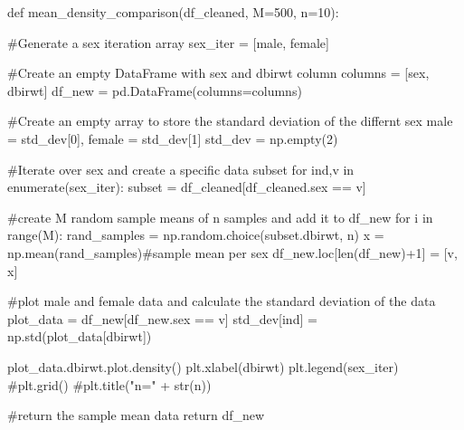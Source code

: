 \documentclass[
  letterpaper,
  DIV=11,
  numbers=noendperiod]{scrreprt}
\newenvironment{Shaded}{\begin{snugshade}}{\end{snugshade}}
\newcommand{\BuiltInTok}[1]{\textcolor[rgb]{0.00,0.23,0.31}{#1}}
\newcommand{\CommentTok}[1]{\textcolor[rgb]{0.37,0.37,0.37}{#1}}
\newcommand{\ControlFlowTok}[1]{\textcolor[rgb]{0.00,0.23,0.31}{#1}}
\newcommand{\DecValTok}[1]{\textcolor[rgb]{0.68,0.00,0.00}{#1}}
\newcommand{\KeywordTok}[1]{\textcolor[rgb]{0.00,0.23,0.31}{#1}}
\newcommand{\NormalTok}[1]{\textcolor[rgb]{0.00,0.23,0.31}{#1}}
\newcommand{\OperatorTok}[1]{\textcolor[rgb]{0.37,0.37,0.37}{#1}}
\newcommand{\StringTok}[1]{\textcolor[rgb]{0.13,0.47,0.30}{#1}}
\begin{document}
\begin{Shaded}
\begin{Highlighting}[]
\KeywordTok{def}\NormalTok{ mean\_density\_comparison(df\_cleaned, M}\OperatorTok{=}\DecValTok{500}\NormalTok{, n}\OperatorTok{=}\DecValTok{10}\NormalTok{):}
    
    \CommentTok{\#Generate a sex iteration array}
\NormalTok{    sex\_iter }\OperatorTok{=}\NormalTok{ [}\StringTok{\textquotesingle{}male\textquotesingle{}}\NormalTok{, }\StringTok{\textquotesingle{}female\textquotesingle{}}\NormalTok{]}
    
    \CommentTok{\#Create an empty DataFrame with \textquotesingle{}sex\textquotesingle{} and \textquotesingle{}dbirwt\textquotesingle{} column}
\NormalTok{    columns }\OperatorTok{=}\NormalTok{ [}\StringTok{\textquotesingle{}sex\textquotesingle{}}\NormalTok{, }\StringTok{\textquotesingle{}dbirwt\textquotesingle{}}\NormalTok{]}
\NormalTok{    df\_new }\OperatorTok{=}\NormalTok{ pd.DataFrame(columns}\OperatorTok{=}\NormalTok{columns)}
    
    \CommentTok{\#Create an empty array to store the standard deviation of the differnt sex \textquotesingle{}male\textquotesingle{} = std\_dev[0], \textquotesingle{}female\textquotesingle{} = std\_dev[1]}
\NormalTok{    std\_dev }\OperatorTok{=}\NormalTok{ np.empty(}\DecValTok{2}\NormalTok{)}
    
    \CommentTok{\#Iterate over sex and create a specific data subset}
    \ControlFlowTok{for}\NormalTok{ ind,v }\KeywordTok{in} \BuiltInTok{enumerate}\NormalTok{(sex\_iter):}
\NormalTok{        subset }\OperatorTok{=}\NormalTok{ df\_cleaned[df\_cleaned.sex }\OperatorTok{==}\NormalTok{ v]}
        
        \CommentTok{\#create M random sample means of n samples and add it to df\_new}
        \ControlFlowTok{for}\NormalTok{ i }\KeywordTok{in} \BuiltInTok{range}\NormalTok{(M):}
\NormalTok{            rand\_samples }\OperatorTok{=}\NormalTok{ np.random.choice(subset.dbirwt, n)}
\NormalTok{            x }\OperatorTok{=}\NormalTok{ np.mean(rand\_samples)}\CommentTok{\#sample mean per sex}
\NormalTok{            df\_new.loc[}\BuiltInTok{len}\NormalTok{(df\_new)}\OperatorTok{+}\DecValTok{1}\NormalTok{] }\OperatorTok{=}\NormalTok{ [v, x]}
        
        \CommentTok{\#plot male and female data and calculate the standard deviation of the data}
\NormalTok{        plot\_data }\OperatorTok{=}\NormalTok{ df\_new[df\_new.sex }\OperatorTok{==}\NormalTok{ v]}
\NormalTok{        std\_dev[ind] }\OperatorTok{=}\NormalTok{ np.std(plot\_data[}\StringTok{\textquotesingle{}dbirwt\textquotesingle{}}\NormalTok{])  }
        
\NormalTok{        plot\_data.dbirwt.plot.density()}
\NormalTok{        plt.xlabel(}\StringTok{\textquotesingle{}dbirwt\textquotesingle{}}\NormalTok{)}
\NormalTok{        plt.legend(sex\_iter)}
        \CommentTok{\#plt.grid()}
        \CommentTok{\#plt.title("n=" + str(n))}
        
    \CommentTok{\#return the sample mean data}
    \ControlFlowTok{return}\NormalTok{ df\_new}
 
        
\end{Highlighting}
\end{Shaded}
\end{document}
